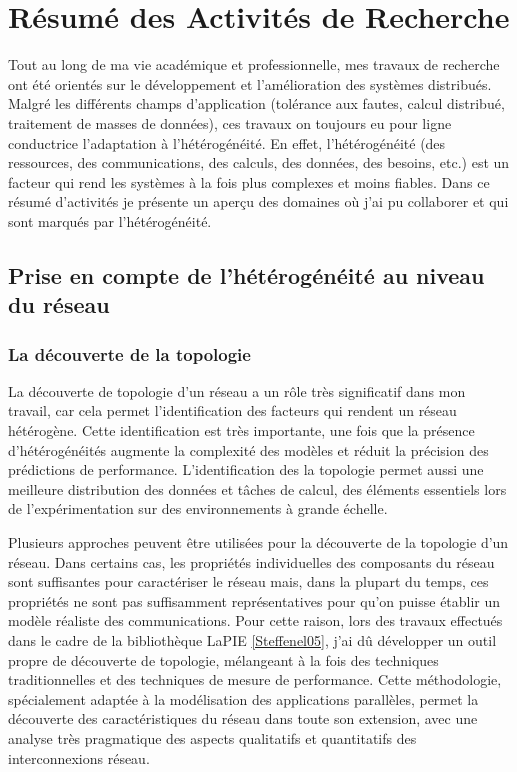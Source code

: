 \documentclass[a4paper]{book}
\begin{document}
\chapter{Résumé des Activités de Recherche}

Tout au long de ma vie académique et professionnelle, mes travaux de recherche ont été orientés sur le développement et l'amélioration des systèmes distribués. Malgré les différents champs d'application (tolérance aux fautes, calcul distribué, traitement de masses de données), ces travaux on toujours eu pour ligne conductrice l'adaptation à l'hétérogénéité. En effet, l'hétérogénéité (des ressources, des communications, des calculs, des données, des besoins, etc.) est un facteur qui rend les systèmes à la fois plus complexes et moins fiables. Dans ce résumé d'activités je présente un aperçu des domaines où j'ai pu collaborer et qui sont marqués par l'hétérogénéité. 

\section{Prise en compte de l'hétérogénéité au niveau du réseau}

\subsection{La découverte de la topologie}

La découverte de topologie d'un réseau a un rôle très significatif dans mon travail, car cela permet l'identification des facteurs qui rendent un réseau hétérogène. Cette identification est très importante, une fois que la présence d'hétérogénéités augmente la complexité des modèles et réduit la précision des prédictions de performance. L'identification des la topologie permet aussi une meilleure distribution des données et tâches de calcul, des éléments essentiels lors de l'expérimentation sur des environnements à grande échelle. 

Plusieurs approches peuvent être utilisées pour la découverte de la topologie d'un réseau. Dans certains cas, les propriétés individuelles des composants du réseau sont suffisantes pour caractériser le réseau mais, dans la plupart du temps, ces propriétés ne sont pas suffisamment représentatives pour qu'on puisse établir un modèle réaliste des communications. Pour cette raison, lors des travaux effectués dans le cadre de la bibliothèque LaPIE \ref{Steffenel05}, j'ai dû développer un outil propre de découverte de topologie, mélangeant à la fois des techniques traditionnelles et des techniques de mesure de performance. Cette méthodologie, spécialement adaptée à la modélisation des applications parallèles, permet la découverte des caractéristiques du réseau dans toute son extension, avec une analyse très pragmatique des aspects qualitatifs et quantitatifs des interconnexions réseau.
\end{document}
